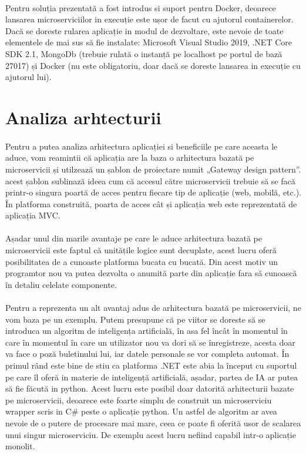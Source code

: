 \documentclass[12pt]{report}
\begin{document}
	\paragraph{}Pentru soluția prezentată a fost introdus si suport pentru Docker, deoarece lansarea microserviciilor in execuție este ușor de facut cu ajutorul containerelor. Dacă se doreste rularea aplicație in modul de dezvoltare, este nevoie de toate elementele de mai sus să fie instalate: Microsoft Visual Studio 2019, .NET Core SDK 2.1, MongoDb (trebuie rulată o instanță pe localhost pe portul de bază 27017) și Docker (nu este obligatoriu, doar dacă se doreste lansarea in execuție cu ajutorul lui).
  	\section{Analiza arhtecturii}
  	\paragraph{}Pentru a putea analiza arhitectura aplicației si beneficiile pe care aceasta le aduce, vom reamintii că aplicația are la baza o arhitectura bazată pe microservicii și utilzează un șablon de proiectare numit „Gateway design pattern”. acest șablon sublinază ideea cum că accesul către microservicii trebuie să se facă printr-o singura poartă de acces pentru fiecare tip de aplicație (web, mobilă, etc.). În platforma construită, poarta de acces cât și aplicația web este reprezentată de aplicația MVC.
  	\paragraph{}Așadar unul din marile avantaje pe care le aduce arhitectura bazată pe microservicii este faptul că unitățile logice sunt decuplate, acest lucru oferă posibilitatea de a cunoaste platforma bucata cu bucată. Din acest motiv un programtor nou va putea dezvolta o anumită parte din aplicație fara să cunoască în detaliu celelate componente.
  	\paragraph{}Pentru a reprezenta un alt avantaj adus de arhitectura bazată pe microservicii, ne vom baza pe un exemplu. Putem presupune că pe viitor se doreste să se introduca un algoritm de inteligența artificială, în asa fel încât în momentul în care în momentul în care un utilizator nou va dori să se înregistreze, acesta doar va face o poză buletinului lui, iar datele personale se vor completa automat. În primul rând este bine de stiu ca platforma .NET este abia la început cu suportul pe care îl oferă in materie de inteligență artificială, așadar, partea de IA ar putea să fie făcută in python. Acest lucru este posibil doar datorită arhitecturii bazate pe microservicii, deoarece este foarte simplu de construit un microserviciu wrapper scris in C\# peste o aplicație python. Un astfel de algoritm ar avea nevoie de o putere de procesare mai mare, ceea ce poate fi oferită usor de scalarea unui singur microserviciu. De exemplu acest lucru nefiind capabil intr-o aplicație monolit. 
\end{document}
